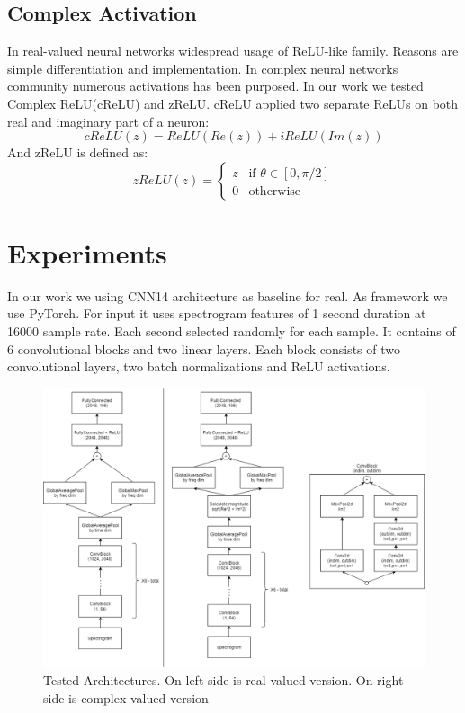 \documentclass{article}
\begin{document}
\subsection{Complex Activation}
In real-valued neural networks widespread usage of ReLU-like family. Reasons are simple differentiation and implementation. In complex neural networks community numerous activations has been purposed.
 In our work we tested Complex ReLU(cReLU)\citet{Trabelsi2017} and zReLU\citep{guberman2016complex}. cReLU applied two separate ReLUs on both real and imaginary part of a neuron:
 \begin{equation}
	cReLU\left(z\right)=ReLU\left(Re\left(z\right)\right)+iReLU(Im(z))
\end{equation}
And zReLU is defined as:
\begin{equation}
	zReLU(z)=
	\begin{cases} 
		z & \text{if $\theta \in [0,\pi/2]$}\\
		0 & \text{otherwise}
	\end{cases}
\end{equation}


\section{Experiments}
\label{sec:experiments}
In our work we using CNN14 architecture \citep{Kong2019} as baseline for real. As framework we use 
PyTorch\citep{NEURIPS2019_9015}. For input it uses spectrogram features of 1 second duration at 
16000 sample rate. Each second selected randomly for each sample. 
It contains of 6 convolutional blocks and two linear layers. Each block consists of two 
convolutional layers, two batch normalizations and ReLU activations.

\begin{figure}
	\centering
	\includegraphics[width=0.49\linewidth]{assets/arch.png}
	\caption{Tested Architectures. On left side is real-valued version. On right side is complex-valued version}
	\label{fig:architectures}
\end{figure}
\end{document}
